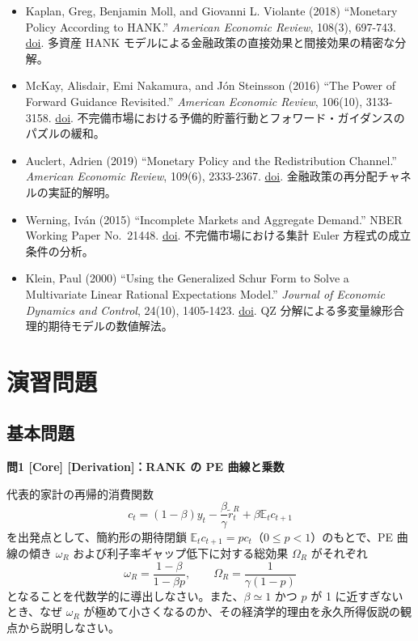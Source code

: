 \documentclass[
  japanese,
  lualatex,
  ja=standard,
  12pt,
  a4paper]{ltjsarticle}
\providecommand{\tightlist}{%
  \setlength{\itemsep}{0pt}\setlength{\parskip}{0pt}}
\begin{document}
\begin{itemize}
\tightlist
\item
  Kaplan, Greg, Benjamin Moll, and Giovanni L. Violante (2018)
  ``Monetary Policy According to HANK.'' \emph{American Economic
  Review}, 108(3), 697-743.
  \href{https://doi.org/10.1257/aer.20160042}{doi}. 多資産 HANK
  モデルによる金融政策の直接効果と間接効果の精密な分解。
\item
  McKay, Alisdair, Emi Nakamura, and Jón Steinsson (2016) ``The Power of
  Forward Guidance Revisited.'' \emph{American Economic Review},
  106(10), 3133-3158. \href{https://doi.org/10.1257/aer.20150063}{doi}.
  不完備市場における予備的貯蓄行動とフォワード・ガイダンスのパズルの緩和。
\item
  Auclert, Adrien (2019) ``Monetary Policy and the Redistribution
  Channel.'' \emph{American Economic Review}, 109(6), 2333-2367.
  \href{https://doi.org/10.1257/aer.20160137}{doi}.
  金融政策の再分配チャネルの実証的解明。
\item
  Werning, Iván (2015) ``Incomplete Markets and Aggregate Demand.'' NBER
  Working Paper No.~21448. \href{https://doi.org/10.3386/w21448}{doi}.
  不完備市場における集計 Euler 方程式の成立条件の分析。
\item
  Klein, Paul (2000) ``Using the Generalized Schur Form to Solve a
  Multivariate Linear Rational Expectations Model.'' \emph{Journal of
  Economic Dynamics and Control}, 24(10), 1405-1423.
  \href{https://doi.org/10.1016/S0165-1889(99)00045-7}{doi}. QZ
  分解による多変量線形合理的期待モデルの数値解法。
\end{itemize}


\section{演習問題}\label{ux6f14ux7fd2ux554fux984c}

\subsection{基本問題}\label{ux57faux672cux554fux984c}


\textbf{問1 {[}Core{]} {[}Derivation{]}：RANK の PE 曲線と乗数}

代表的家計の再帰的消費関数 \[
c_t = (1-\beta)y_t - \frac{\beta}{\gamma}\widetilde{r}_t^R + \beta \mathbb{E}_t c_{t+1}
\] を出発点として、簡約形の期待閉鎖
\(\mathbb{E}_t c_{t+1} = p c_t\)（\(0 \leq p < 1\)）のもとで、PE
曲線の傾き \(\omega_R\) および利子率ギャップ低下に対する総効果
\(\Omega_R\) がそれぞれ \[
\omega_R = \frac{1-\beta}{1-\beta p},
\qquad
\Omega_R = \frac{1}{\gamma(1-p)}
\] となることを代数学的に導出しなさい。また、\(\beta \simeq 1\) かつ
\(p\) が 1 に近すぎないとき、なぜ \(\omega_R\)
が極めて小さくなるのか、その経済学的理由を永久所得仮説の観点から説明しなさい。
\end{document}
